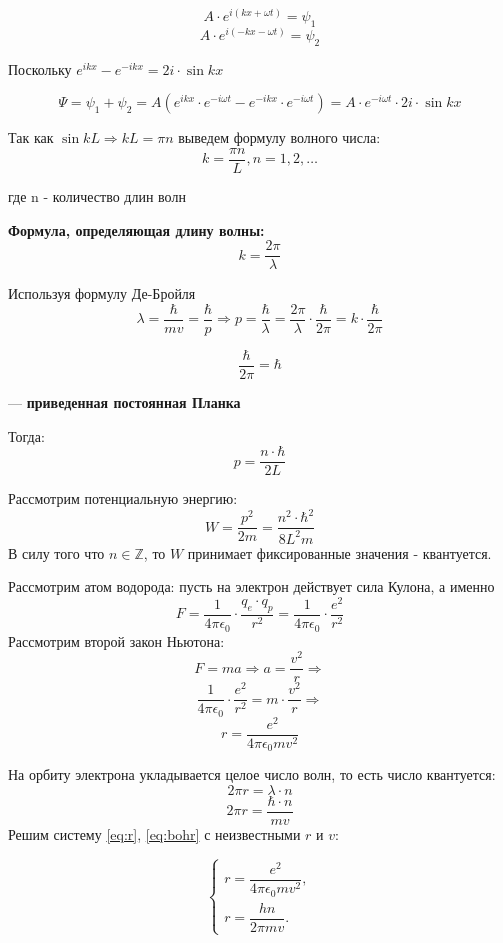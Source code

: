 \documentclass[../main.tex]{subfiles}
\begin{document}
\[A \cdot e^{i(kx+ \omega t)} = \psi_1\]
\[A \cdot e^{i(-kx - \omega t)} = \psi_2\]

Поскольку $e^{ikx} - e^{-ikx} = 2i \cdot \sin{kx}$

\[\Psi = \psi_1 + \psi_2 = A(e^{ikx} \cdot e^{-i \omega t} - e^{- ikx} \cdot e^{-i \omega t}) = A \cdot e^{-i \omega t} \cdot 2i \cdot \sin{kx} \]

Так как $\sin{kL} \Rightarrow kL = \pi n$ выведем формулу волного числа:
\[k = \frac{\pi n}{L} , n = 1, 2, \ldots\]
\begin{center}
    где n - количество длин волн
\end{center}

\textbf{Формула, определяющая длину волны:}
\[k = \frac{2 \pi}{\lambda}\]

Используя формулу Де-Бройля 
\[\lambda = \frac{\hbar}{mv} = \frac{\hbar}{p} \Rightarrow p = \frac{\hbar}{\lambda} = \frac{2 \pi}{\lambda} \cdot \frac{\hbar}{2 \pi} = k\cdot \frac{\hbar}{2 \pi}\]

\[\frac{\hbar}{2 \pi} = \hbar\]
\begin{center}
    --- \textbf{приведенная постоянная Планка}
\end{center}

Тогда:
\[p = \frac{n \cdot \hbar}{2 L}\]

Рассмотрим потенциальную энергию:
\[W = \frac{p^2}{2 m} = \frac{n^2 \cdot \hbar^2}{8L^2 m}\]
В силу того что $n \in \mathbb{Z}$, то $W$ принимает фиксированные значения - квантуется.

Рассмотрим атом водорода: пусть на электрон действует сила Кулона, а именно
\[F = \frac{1}{4 \pi \epsilon_0} \cdot \frac{q_e \cdot q_p}{r^2} = \frac{1}{4 \pi \epsilon_0} \cdot \frac{e^2}{r^2}\]
Рассмотрим второй закон Ньютона:
\[F = ma \Rightarrow a = \frac{v^2}{r} \Rightarrow\]
\[\frac{1}{4 \pi \epsilon_0} \cdot \frac{e^2}{r^2} = m \cdot \frac{v^2}{r} \Rightarrow\]
\begin{equation} \label{eq:r}
    r = \frac{e^2}{4 \pi \epsilon_0 m v^2}
\end{equation}

На орбиту электрона укладывается целое число волн, то есть число квантуется: 
\[2 \pi r = \lambda \cdot n\]
\begin{equation} \label{eq:bohr}
    2 \pi r = \frac{\hbar \cdot n}{m v}
\end{equation}
Решим систему \eqref{eq:r}, \eqref{eq:bohr} с неизвестными $r$ и $v$:

\[
\begin{cases}
r = \dfrac{e^2}{4 \pi \epsilon_0 m v^2},\\[4pt]
r = \dfrac{h n}{2 \pi m v}.
\end{cases}
\]
\end{document}
